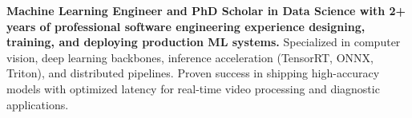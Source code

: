 \documentclass[../main.tex]{subfiles}
\begin{document}
\textbf{Machine Learning Engineer and PhD Scholar in Data Science with 2+ years of professional software engineering experience designing, training, and deploying production ML systems.}
Specialized in computer vision, deep learning backbones, inference acceleration (TensorRT, ONNX, Triton), and distributed pipelines.
Proven success in shipping high-accuracy models with optimized latency for real-time video processing and diagnostic applications.
\end{document}
